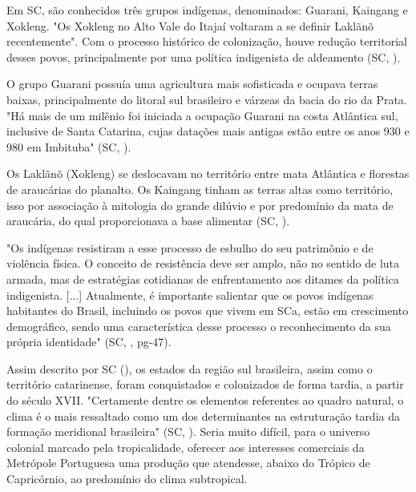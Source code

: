 
\indent Em \acrlong{SC}, são conhecidos três grupos indígenas, denominados: Guarani, Kaingang e Xokleng. "Os Xokleng no Alto Vale do Itajaí voltaram a se definir Laklãnõ recentemente". Com o processo histórico de colonização, houve redução  territorial desses povos, principalmente por uma política indigenista de aldeamento (\acrlong{SC}, \citeyear{AtlasSCpopulacao}).

\indent O grupo Guarani possuía uma agricultura mais sofisticada e ocupava terras baixas, principalmente do litoral sul brasileiro e várzeas da bacia do rio da Prata. "Há mais de um milênio foi iniciada a ocupação Guarani na costa Atlântica sul, inclusive de Santa Catarina, cujas datações mais antigas estão entre os anos 930 e 980 em Imbituba" (\acrlong{SC}, \citeyear{AtlasSCpopulacao}).

\indent Os Laklãnõ (Xokleng) se deslocavam no território entre mata Atlântica e florestas de araucárias do planalto. Os Kaingang tinham as terras altas como território, isso por associação à mitologia do grande dilúvio e por predomínio da mata de araucária, do qual proporcionava a base alimentar (\acrlong{SC}, \citeyear{AtlasSCpopulacao}).

\begin{citacao}
"Os indígenas resistiram a esse processo de esbulho do seu patrimônio e de violência física. O conceito de resistência deve ser amplo, não no sentido de luta armada, mas de estratégias cotidianas de enfrentamento aos ditames da política indigenista. [...] Atualmente, é importante salientar que os povos indígenas habitantes do Brasil, incluindo os povos que vivem em \acrlong{SC}a, estão em crescimento demográfico, sendo uma característica desse processo o reconhecimento da sua própria identidade" (\acrlong{SC}, \citeyear{AtlasSCpopulacao}, pg-47).
\end{citacao}

\indent Assim descrito por \acrlong{SC} (\citeyear{AtlasSCpopulacao}), os estados da região sul brasileira, assim como o território catarinense, foram conquistados e colonizados de forma tardia, a partir do século XVII. "Certamente dentre os elementos referentes ao quadro natural, o clima é o mais ressaltado como um dos determinantes na estruturação tardia da formação meridional brasileira" (\acrlong{SC}, \citeyear{AtlasSCpopulacao}). Seria muito difícil, para o universo colonial marcado pela tropicalidade, oferecer aos interesses comerciais da Metrópole Portuguesa uma produção que atendesse, abaixo do Trópico de Capricórnio, ao predomínio do clima subtropical.

